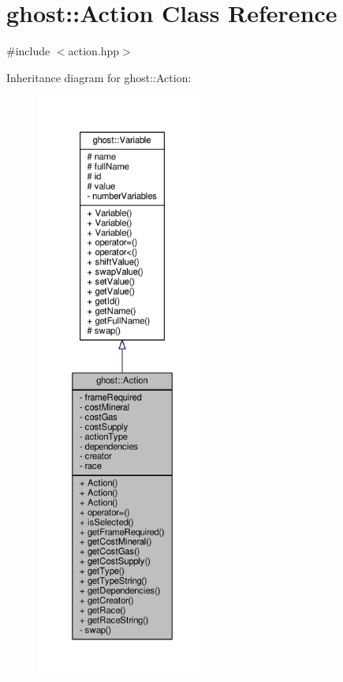 \hypertarget{classghost_1_1Action}{\section{ghost\-:\-:Action Class Reference}
\label{classghost_1_1Action}
}


{\ttfamily \#include $<$action.\-hpp$>$}



Inheritance diagram for ghost\-:\-:Action\-:
\nopagebreak
\begin{figure}[H]
\begin{center}
\leavevmode
\includegraphics[height=550pt]{classghost_1_1Action__inherit__graph}
\end{center}
\end{figure}


